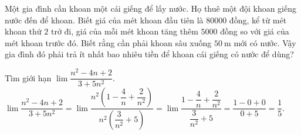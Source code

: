 \begin{bt}%
	Một gia đình cần khoan một cái giếng để lấy nước. Họ thuê một đội khoan giếng nước đến để khoan. Biết giá của mét khoan đầu tiên là $80000$ đồng, kể từ mét khoan thứ $2$ trở đi, giá của mỗi mét khoan tăng thêm $5000$ đồng so với giá của mét khoan trước đó. Biết rằng cần phải khoan sâu xuống $50 \mathrm{~m}$ mới có nước. Vậy gia đình đó phải trả ít nhất bao nhiêu tiền để khoan cái giếng có nước để dùng?
\end{bt}
\begin{bt}%
	Tìm giới hạn $\lim\dfrac{n^2-4n+2}{3+5n^2}$.
	\loigiai
	{
		$\lim\dfrac{n^2-4n+2}{3+5n^2}=\lim\dfrac{n^2\left(1-\dfrac{4}{n}+\dfrac{2}{n^2}\right)}{n^2\left(\dfrac{3}{n^2}+5\right)}=\lim\dfrac{1-\dfrac{4}{n}+\dfrac{2}{n^2}}{\dfrac{3}{n^2}+5}=\dfrac{1-0+0}{0+5}=\dfrac{1}{5}$.
	}
\end{bt}
